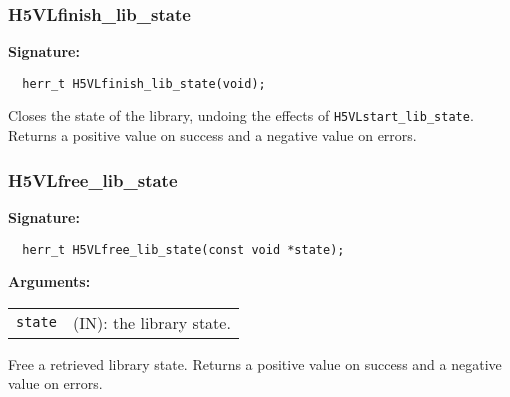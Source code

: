\subsubsection{H5VLfinish\_lib\_state}
\begin{mdframed}[style=bgbox]
\textbf{Signature:}
\begin{lstlisting}
  herr_t H5VLfinish_lib_state(void);
\end{lstlisting}
\end{mdframed}
Closes the state of the library, undoing the effects of {\tt H5VLstart\_lib\_state}.
Returns a positive value on success and a negative value on errors.
\bigskip


\subsubsection{H5VLfree\_lib\_state}
\begin{mdframed}[style=bgbox]
\textbf{Signature:}
\begin{lstlisting}
  herr_t H5VLfree_lib_state(const void *state);
\end{lstlisting}
\textbf{Arguments:}\\
\begin{tabular}{l p{13.5cm}}
 {\tt state} & (IN): the library state.\\
\end{tabular}
\end{mdframed}
Free a retrieved library state.
Returns a positive value on success and a negative value on errors.
\bigskip


